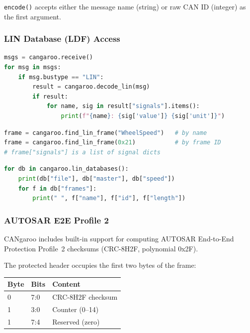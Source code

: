\documentclass[a4paper,11pt]{article}
\begin{document}
\texttt{encode()} accepts either the message name (string) or raw CAN ID (integer)
as the first argument.

\subsubsection{LIN Database (LDF) Access}

\begin{lstlisting}[language=Python, caption={Decode a received LIN frame}]
msgs = cangaroo.receive()
for msg in msgs:
    if msg.bustype == "LIN":
        result = cangaroo.decode_lin(msg)
        if result:
            for name, sig in result["signals"].items():
                print(f"{name}: {sig['value']} {sig['unit']}")
\end{lstlisting}

\begin{lstlisting}[language=Python, caption={Look up a LIN frame definition}]
frame = cangaroo.find_lin_frame("WheelSpeed")   # by name
frame = cangaroo.find_lin_frame(0x21)           # by frame ID
# frame["signals"] is a list of signal dicts
\end{lstlisting}

\begin{lstlisting}[language=Python, caption={List all loaded LDF databases}]
for db in cangaroo.lin_databases():
    print(db["file"], db["master"], db["speed"])
    for f in db["frames"]:
        print(" ", f["name"], f["id"], f["length"])
\end{lstlisting}

\subsubsection{AUTOSAR E2E Profile 2}

CANgaroo includes built-in support for computing AUTOSAR End-to-End Protection
Profile~2 checksums (CRC-8H2F, polynomial 0x2F).

The protected header occupies the first two bytes of the frame:

\begin{table}[h]
  \centering
  \begin{tabularx}{0.7\textwidth}{llX}
    \toprule
    \textbf{Byte} & \textbf{Bits} & \textbf{Content} \\
    \midrule
    0 & 7:0 & CRC-8H2F checksum \\
    1 & 3:0 & Counter (0–14) \\
    1 & 7:4 & Reserved (zero) \\
    \bottomrule
  \end{tabularx}
\end{table}
\end{document}
